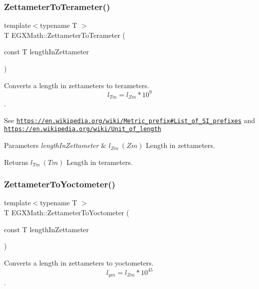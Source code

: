 \subsubsection{\texorpdfstring{Zettameter\+To\+Terameter()}{ZettameterToTerameter()}}
{\footnotesize\ttfamily template$<$typename T $>$ \\
T E\+G\+X\+Math\+::\+Zettameter\+To\+Terameter (\begin{DoxyParamCaption}\item[{const T}]{length\+In\+Zettameter }\end{DoxyParamCaption})}



Converts a length in zettameters to terameters. \[ l_{Tm}=l_{Zm} * 10^{9} \]. 

See \href{https://en.wikipedia.org/wiki/Metric_prefix#List_of_SI_prefixes}{\tt https\+://en.\+wikipedia.\+org/wiki/\+Metric\+\_\+prefix\#\+List\+\_\+of\+\_\+\+S\+I\+\_\+prefixes} and \href{https://en.wikipedia.org/wiki/Unit_of_length}{\tt https\+://en.\+wikipedia.\+org/wiki/\+Unit\+\_\+of\+\_\+length} 
\begin{DoxyParams}{Parameters}
{\em length\+In\+Zettameter} & $ l_{Zm}\ (Zm)$ Length in zettameters. \\
\hline
\end{DoxyParams}
\begin{DoxyReturn}{Returns}
$ l_{Tm}\ (Tm)$ Length in terameters. 
\end{DoxyReturn}
\mbox{\label{group___e_g_x_math-_conversions-_length_conversions-_s_i-_zettameter-_s_i_ga027661828604c5467325eb50e084d96d}} 
\subsubsection{\texorpdfstring{Zettameter\+To\+Yoctometer()}{ZettameterToYoctometer()}}
{\footnotesize\ttfamily template$<$typename T $>$ \\
T E\+G\+X\+Math\+::\+Zettameter\+To\+Yoctometer (\begin{DoxyParamCaption}\item[{const T}]{length\+In\+Zettameter }\end{DoxyParamCaption})}



Converts a length in zettameters to yoctometers. \[ l_{ym}=l_{Zm} * 10^{45} \]. 

